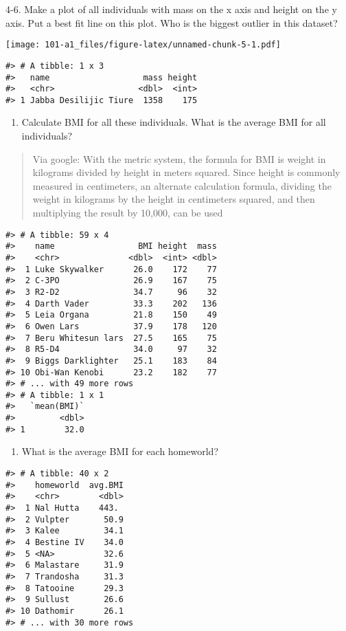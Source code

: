 \documentclass[
]{book}
\providecommand{\tightlist}{%
  \setlength{\itemsep}{0pt}\setlength{\parskip}{0pt}}
\begin{document}
4-6. Make a plot of all individuals with mass on the x axis and height on the y axis. Put a best fit line on this plot. Who is the biggest outlier in this dataset?

\texttt{[image: 101-a1\_files/figure-latex/unnamed-chunk-5-1.pdf]}

\begin{verbatim}
#> # A tibble: 1 x 3
#>   name                   mass height
#>   <chr>                 <dbl>  <int>
#> 1 Jabba Desilijic Tiure  1358    175
\end{verbatim}

\begin{enumerate}
\def\labelenumi{\arabic{enumi}.}
\setcounter{enumi}{6}
\tightlist
\item
  Calculate BMI for all these individuals. What is the average BMI for all individuals?
\end{enumerate}

\begin{quote}
Via google: With the metric system, the formula for BMI is weight in kilograms divided by height in meters squared. Since height is commonly measured in centimeters, an alternate calculation formula, dividing the weight in kilograms by the height in centimeters squared, and then multiplying the result by 10,000, can be used
\end{quote}

\begin{verbatim}
#> # A tibble: 59 x 4
#>    name                 BMI height  mass
#>    <chr>              <dbl>  <int> <dbl>
#>  1 Luke Skywalker      26.0    172    77
#>  2 C-3PO               26.9    167    75
#>  3 R2-D2               34.7     96    32
#>  4 Darth Vader         33.3    202   136
#>  5 Leia Organa         21.8    150    49
#>  6 Owen Lars           37.9    178   120
#>  7 Beru Whitesun lars  27.5    165    75
#>  8 R5-D4               34.0     97    32
#>  9 Biggs Darklighter   25.1    183    84
#> 10 Obi-Wan Kenobi      23.2    182    77
#> # ... with 49 more rows
#> # A tibble: 1 x 1
#>   `mean(BMI)`
#>         <dbl>
#> 1        32.0
\end{verbatim}

\begin{enumerate}
\def\labelenumi{\arabic{enumi}.}
\setcounter{enumi}{7}
\tightlist
\item
  What is the average BMI for each homeworld?
\end{enumerate}

\begin{verbatim}
#> # A tibble: 40 x 2
#>    homeworld  avg.BMI
#>    <chr>        <dbl>
#>  1 Nal Hutta    443. 
#>  2 Vulpter       50.9
#>  3 Kalee         34.1
#>  4 Bestine IV    34.0
#>  5 <NA>          32.6
#>  6 Malastare     31.9
#>  7 Trandosha     31.3
#>  8 Tatooine      29.3
#>  9 Sullust       26.6
#> 10 Dathomir      26.1
#> # ... with 30 more rows
\end{verbatim}
\end{document}
